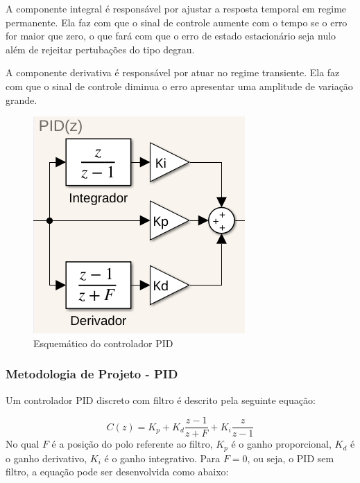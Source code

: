 \documentclass[conference,harvard,brazil,english]{sbatex}
\begin{document}
            A componente integral é responsável por ajustar a resposta temporal em regime permanente. Ela faz com que o sinal de controle aumente com o tempo se o erro for maior que zero, o que fará com que o erro de estado estacionário seja nulo além de rejeitar pertubações do tipo degrau.
            
            A componente derivativa é responsável por atuar no regime transiente. Ela faz com que o sinal de controle diminua o erro apresentar uma amplitude de variação grande.
            
            \begin{figure}[!htb] 
            \centering \includegraphics[width=0.5\columnwidth]{imagens/esquemaPID.png}{
                \small
                \centering
                \caption{Esquemático do controlador PID}
                \label{PID_corte}}
            \end{figure}
            
            \subsubsection{Metodologia de Projeto - PID}
            
                Um controlador PID discreto com filtro é descrito pela seguinte equação:
                
                \begin{equation}
                    C(z) = K_p + K_d\frac{z-1}{z+F} + K_i\frac{z}{z-1}
                \end{equation}
                No qual $F$ é a posição do polo referente ao filtro, $K_p$ é o ganho proporcional, $K_d$ é o ganho derivativo, $K_i$ é o ganho integrativo.
                Para $F=0$, ou seja, o PID sem filtro, a equação pode ser desenvolvida como abaixo:
                
\end{document}
